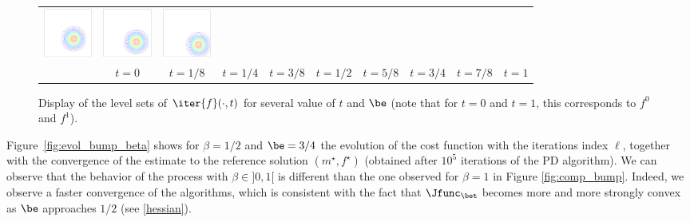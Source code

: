 \begin{figure}[!ht]
\begin{center}
\begin{tabular}{cccccccccc}
\hspace{-0.45cm}\includegraphics[width=1.6cm]{images/bump_beta/bump_beta_100_iso_25}&
\hspace{-0.45cm}\includegraphics[width=1.6cm]{images/bump_beta/bump_beta_100_iso_29}&
\hspace{-0.45cm}\includegraphics[width=1.6cm]{images/bump_beta/bump_beta_100_iso_33}\\
&\hspace{-0.45cm}$t=0$&\hspace{-0.45cm}$t=1/8$&
\hspace{-0.45cm}$t=1/4$&\hspace{-0.45cm}$t=3/8$&
\hspace{-0.45cm}$t=1/2$&\hspace{-0.45cm}$t=5/8$&
\hspace{-0.45cm}$t=3/4$&\hspace{-0.45cm}$t=7/8$&\hspace{-0.45cm}$t=1$\vspace{-0.2cm}
\end{tabular}
\caption{\label{fig:generalized_bump} 
Display of the level sets of $\iter{f}(\cdot,t)$ for several value of $t$ and $\be$ (note that for $t=0$ and $t=1$, this corresponds to $f^0$ and $f^1$).}
\end{center}
\end{figure}

Figure~\ref{fig:evol_bump_beta} shows for $\beta = 1/2$ and $\be = 3/4$ the evolution of the cost function with the iterations index $\ell$, together with the convergence of the estimate to the reference solution $(m^\star,f^\star)$ (obtained after $10^5$ iterations of the PD algorithm). We can observe that the behavior of the process with $\beta \in ]0,1[$ is different than the one observed for $\beta=1$ in Figure \ref{fig:comp_bump}. Indeed, we observe a faster convergence of the algorithms, which is consistent with the fact that $\Jfunc_\bet$ becomes more and more strongly convex as $\be$ approaches $1/2$ (see \eqref{hessian}). 

